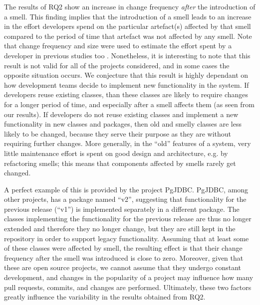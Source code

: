 The results of RQ2 show an increase in change frequency \emph{after} the introduction of a smell.
This finding implies that the introduction of a smell leads to an increase in the effort developers spend on the particular artefact(s) affected by that smell compared to the period of time that artefact was not affected by any smell. 
Note that change frequency and size were used to estimate the effort spent by a developer in previous studies too \cite{Sjoberg2013,Olbrich2009,Nugroho2011}.
Nonetheless, it is interesting to note that this result is not valid for all of the projects considered, and in some cases the opposite situation occurs.
We conjecture that this result is highly dependant on how development teams decide to implement new functionality in the system.
If developers reuse existing classes, than these classes are likely to require changes for a longer period of time, and especially after a smell affects them (as seen from our results).
If developers do not reuse existing classes and implement a new functionality in new classes and packages, then old and smelly classes are less likely to be changed, because they serve their purpose as they are without requiring further changes.
More generally, in the ``old'' features of a system, very little maintenance effort is spent on good design and architecture, e.g. by refactoring smells; this means that components affected by smells rarely get changed.

A perfect example of this is provided by the project PgJDBC.
PgJDBC, among other projects, has a package named ``v2'', suggesting that functionality for the previous release (``v1'') is implemented separately in a different package.
The classes implementing the functionality for the previous release are thus no longer extended and therefore they no longer change, but they are still kept in the repository in order to support legacy functionality.
Assuming that at least some of these classes were affected by smell, the resulting effect is that their change frequency after the smell was introduced is close to zero.
Moreover, given that these are open source projects, we cannot assume that they undergo constant development, and changes in the popularity of a project may influence how many pull requests, commits, and changes are performed. 
Ultimately, these two factors greatly influence the variability in the results obtained from RQ2.

